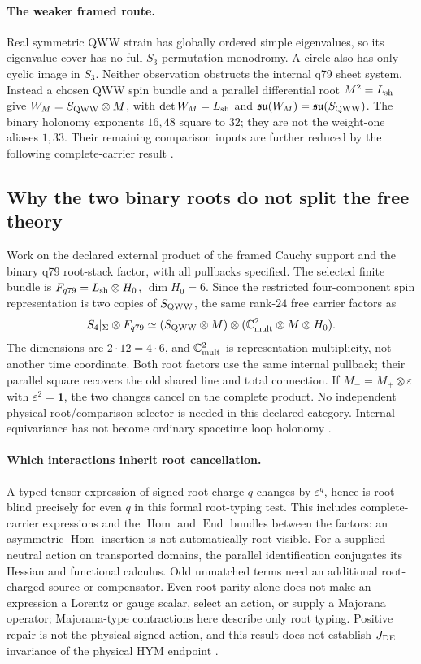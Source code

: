 \documentclass[11pt]{article}
\begin{document}
\paragraph{The weaker framed route.}\label{sec:fsb04k}
Real symmetric QWW strain has globally ordered simple eigenvalues, so its
eigenvalue cover has no full $S_3$ permutation monodromy. A circle also has
only cyclic image in $S_3$. Neither observation obstructs the internal q79
sheet system. Instead a chosen QWW spin bundle and a parallel differential
root $M^2=L_{\rm sh}$ give $W_M=S_{\rm QWW}\otimes M$, with
$\det W_M=L_{\rm sh}$ and $\mathfrak{su}(W_M)=\mathfrak{su}(S_{\rm QWW})$.
The binary holonomy exponents $16,48$ square to $32$; they are not the
weight-one aliases $1,33$. Their remaining comparison inputs are further
reduced by the following complete-carrier result \cite{FSB04k}.

\subsection{Why the two binary roots do not split the free theory}
\label{sec:fsb04l}
Work on the declared external product of the framed Cauchy support and the
binary q79 root-stack factor, with all pullbacks specified. The selected
finite bundle is $F_{q79}=L_{\rm sh}\otimes H_0$, $\dim H_0=6$.
Since the restricted four-component spin representation is two copies of
$S_{\rm QWW}$, the same rank-$24$ free carrier factors as
\[
 S_4|_\Sigma\otimes F_{q79}
 \simeq (S_{\rm QWW}\otimes M)\otimes
 (\mathbb C^2_{\rm mult}\otimes M\otimes H_0).
\]
The dimensions are $2\cdot12=4\cdot6$, and $\mathbb C^2_{\rm mult}$ is
representation multiplicity, not another time coordinate. Both root factors
use the same internal pullback; their parallel square recovers the old shared
line and total connection. If $M_-=M_+\otimes\varepsilon$ with
$\varepsilon^2=\mathbf1$, the two changes cancel on the complete product.
No independent physical root/comparison selector is needed in this declared
category. Internal equivariance has not become ordinary spacetime loop
holonomy \cite{FSB04l}.

\paragraph{Which interactions inherit root cancellation.}\label{sec:fsb04m}
A typed tensor expression of signed root charge $q$ changes by
$\varepsilon^q$, hence is root-blind precisely for even $q$ in this formal
root-typing test. This includes complete-carrier expressions and the
$\operatorname{Hom}$ and $\operatorname{End}$ bundles between the factors:
an asymmetric $\operatorname{Hom}$ insertion is not automatically
root-visible. For a supplied neutral action on transported domains, the
parallel identification conjugates its Hessian and functional calculus.
Odd unmatched terms need an additional root-charged source or compensator.
Even root parity alone does not make an expression a Lorentz or gauge scalar,
select an action, or supply a Majorana operator; Majorana-type contractions
here describe only root typing. Positive repair is not the physical signed
action, and this result does not establish $J_{\rm DE}$ invariance of the
physical HYM endpoint \cite{FSB04m}.
\end{document}
